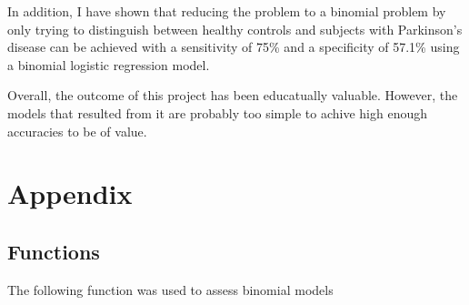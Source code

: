 \documentclass[
  english,
  doc,floatsintext]{apa6}
\begin{document}
In addition, I have shown that reducing the problem to a binomial problem by only trying to distinguish
between healthy controls and subjects with Parkinson's disease can be achieved with a sensitivity of 75\%
and a specificity of 57.1\% using a binomial logistic regression model.

Overall, the outcome of this project has been educatually valuable. However, the models that resulted from
it are probably too simple to achive high enough accuracies to be of value.

\clearpage

\hypertarget{appendix}{%
\section{Appendix}\label{appendix}}

\hypertarget{functions}{%
\subsection{Functions}\label{functions}}

The following function was used to assess binomial models
\end{document}
